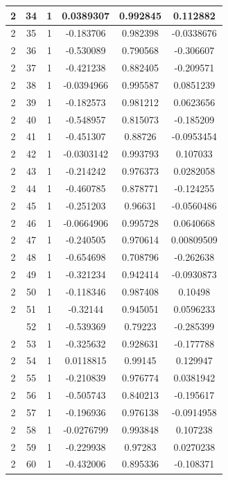 \documentclass[12pt,a4paper]{article}
\numberwithin{equation}{section}
\numberwithin{figure}{section}
\numberwithin{table}{section}
\begin{document}
\begin{longtable}{|c|c|c|c|c|c|}
2 & 34 & 1 & 0.0389307 & 0.992845 & 0.112882 \\ \hline
2 & 35 & 1 & -0.183706 & 0.982398 & -0.0338676 \\ \hline
2 & 36 & 1 & -0.530089 & 0.790568 & -0.306607 \\ \hline
2 & 37 & 1 & -0.421238 & 0.882405 & -0.209571 \\ \hline
2 & 38 & 1 & -0.0394966 & 0.995587 & 0.0851239 \\ \hline
2 & 39 & 1 & -0.182573 & 0.981212 & 0.0623656 \\ \hline
2 & 40 & 1 & -0.548957 & 0.815073 & -0.185209 \\ \hline
2 & 41 & 1 & -0.451307 & 0.88726 & -0.0953454 \\ \hline
2 & 42 & 1 & -0.0303142 & 0.993793 & 0.107033 \\ \hline
2 & 43 & 1 & -0.214242 & 0.976373 & 0.0282058 \\ \hline
2 & 44 & 1 & -0.460785 & 0.878771 & -0.124255 \\ \hline
2 & 45 & 1 & -0.251203 & 0.96631 & -0.0560486 \\ \hline
2 & 46 & 1 & -0.0664906 & 0.995728 & 0.0640668 \\ \hline
2 & 47 & 1 & -0.240505 & 0.970614 & 0.00809509 \\ \hline
2 & 48 & 1 & -0.654698 & 0.708796 & -0.262638 \\ \hline
2 & 49 & 1 & -0.321234 & 0.942414 & -0.0930873 \\ \hline
2 & 50 & 1 & -0.118346 & 0.987408 & 0.10498 \\ \hline
2 & 51 & 1 & -0.32144 & 0.945051 & 0.0596233 \\ \hline
\pagebreak
2 & 52 & 1 & -0.539369 & 0.79223 & -0.285399 \\ \hline
2 & 53 & 1 & -0.325632 & 0.928631 & -0.177788 \\ \hline
2 & 54 & 1 & 0.0118815 & 0.99145 & 0.129947 \\ \hline
2 & 55 & 1 & -0.210839 & 0.976774 & 0.0381942 \\ \hline
2 & 56 & 1 & -0.505743 & 0.840213 & -0.195617 \\ \hline
2 & 57 & 1 & -0.196936 & 0.976138 & -0.0914958 \\ \hline
2 & 58 & 1 & -0.0276799 & 0.993848 & 0.107238 \\ \hline
2 & 59 & 1 & -0.229938 & 0.97283 & 0.0270238 \\ \hline
2 & 60 & 1 & -0.432006 & 0.895336 & -0.108371 \\ \hline

\end{longtable}
\end{document}
